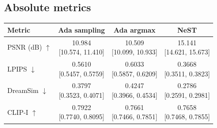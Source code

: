\documentclass[11pt,letterpaper]{article}
\begin{document}
\subsection*{Absolute metrics}
\begin{center}\small\setlength{\tabcolsep}{12pt}\renewcommand{\arraystretch}{1.55}
\begin{tabular}{lccc}
\toprule
Metric & Ada sampling & Ada argmax & NeST\\\midrule
PSNR (dB) $\uparrow$ & \shortstack{10.984\\{}[10.574, 11.410]} & \shortstack{10.509\\{}[10.099, 10.933]} & \shortstack{15.141\\{}[14.621, 15.673]}\\
LPIPS $\downarrow$ & \shortstack{0.5610\\{}[0.5457, 0.5759]} & \shortstack{0.6033\\{}[0.5857, 0.6209]} & \shortstack{0.3668\\{}[0.3511, 0.3823]}\\
DreamSim $\downarrow$ & \shortstack{0.3797\\{}[0.3523, 0.4071]} & \shortstack{0.4247\\{}[0.3966, 0.4534]} & \shortstack{0.2786\\{}[0.2591, 0.2981]}\\
CLIP-I $\uparrow$ & \shortstack{0.7922\\{}[0.7740, 0.8095]} & \shortstack{0.7661\\{}[0.7466, 0.7851]} & \shortstack{0.7658\\{}[0.7468, 0.7855]}\\
\bottomrule\end{tabular}\end{center}
\end{document}
